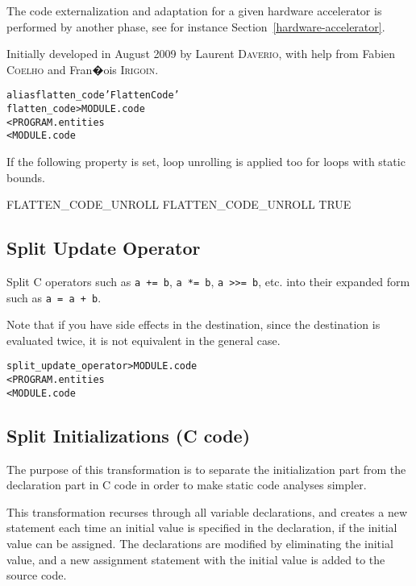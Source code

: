 \documentclass[a4paper]{report}
\newenvironment{PipsMake}{\begin{alltt}}{\end{alltt}}
\newenvironment{PipsPass}[1]{\label{pass:#1}}{}
\begin{document}
The code externalization and adaptation for a given hardware
accelerator is performed by another phase, see for instance
Section~\ref{hardware-accelerator}.

Initially developed in August 2009 by Laurent \textsc{Daverio}, with help from
Fabien \textsc{Coelho} and Fran�ois \textsc{Irigoin}.

\begin{PipsMake}
alias flatten_code 'Flatten Code'
flatten_code > MODULE.code
        < PROGRAM.entities
        < MODULE.code
\end{PipsMake}

If the following property is set, loop unrolling is applied too for loops
with static bounds.
\begin{PipsProp}{FLATTEN_CODE_UNROLL}
FLATTEN_CODE_UNROLL TRUE
\end{PipsProp}


\subsection{Split Update Operator}

\begin{PipsPass}{split_update_operator}
  Split C operators such as \verb/a += b/, \verb/a *= b/, \verb/a >>= b/,
  etc. into their expanded form such as \verb/a = a + b/.
\end{PipsPass}

Note that if you have side effects in the destination, since the
destination is evaluated twice, it is not equivalent in the general case.

\begin{PipsMake}
split_update_operator > MODULE.code
        < PROGRAM.entities
        < MODULE.code
\end{PipsMake}


\subsection{Split Initializations (C code)}

\begin{PipsPass}{split_initializations}
The purpose of this transformation is to separate the initialization
part from the declaration part in C code in order to make static code
analyses simpler.
\end{PipsPass}

This transformation recurses through all variable declarations, and
creates a new statement each time an initial value is specified in the
declaration, if the initial value can be assigned. The declarations
are modified by eliminating the initial value, and a new assignment
statement with the initial value is added to the source code.
\end{document}
